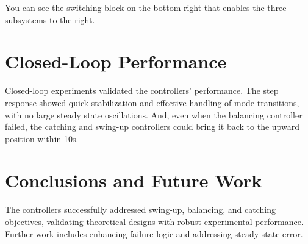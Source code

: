 \documentclass[12pt]{article}
\begin{document}
You can see the switching block on the bottom right that enables the three subsystems to the right.
\section{Closed-Loop Performance}

Closed-loop experiments validated the controllers' performance. The step response showed quick stabilization and effective handling of mode transitions, with no large steady state oscillations. And, even when the balancing controller failed, the catching and swing-up controllers could bring it back to the upward position within 10s. 




\section{Conclusions and Future Work}
The controllers successfully addressed swing-up, balancing, and catching objectives, validating theoretical designs with robust experimental performance. Further work includes enhancing failure logic and addressing steady-state error.



\end{document}

